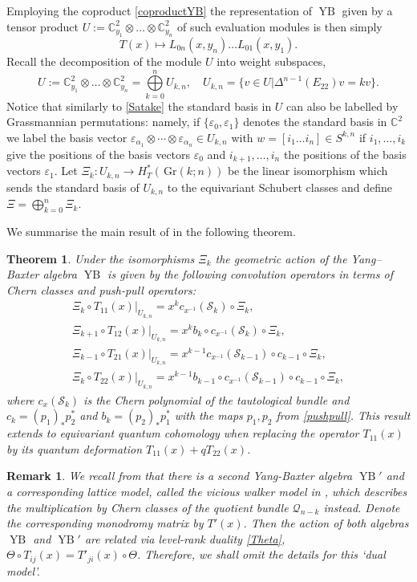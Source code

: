 \documentclass[12pt]{amsart}
\newcommand{\C}{\mathbb{C}}
\newcommand{\cS}{\mathcal{S}}
\newcommand{\cQ}{\mathcal{Q}}
\newcommand{\Gr}{\,\mathrm{Gr}}
\newcommand{\veps}{\varepsilon}
\newtheorem{remark}{Remark}[section]
\newtheorem{thm}{Theorem}[section]
\numberwithin{equation}{section}
\numberwithin{figure}{section}
\newcommand{\YB}{\operatorname{YB}}
\begin{document}
Employing the coproduct \eqref{coproductYB} the representation of $\YB$ given by a tensor product $U := \C^2_{y_1} \otimes \ldots \otimes \C^2_{y_n}$ of such evaluation modules is then simply
\[
T(x) \mapsto L_{0n}(x , y_n) \ldots L_{01}(x , y_1).
\]
Recall the decomposition of the module $U$ into weight subspaces,
\[
U := \C^2_{y_1} \otimes \ldots \otimes \C^2_{y_n} = \bigoplus\limits_{k = 0}^n U_{k , n}, \quad U_{k,n} = \{v \in U | \Delta^{n - 1}(E_{22}) v = k v\}.
\]
Notice that similarly to \eqref{Satake} the standard basis in $U$ can also be labelled by Grassmannian permutations: namely, if $\{\veps_0,\veps_1\}$ denotes the standard basis in $\C^2$ we label the basis vector $\veps_{\alpha_1}\otimes\cdots\otimes\veps_{\alpha_n}\in U_{k,n}$ with $w=[i_1\ldots i_n]\in S^{k,n}$ if $i_1,\ldots,i_k$ give the positions of the basis vectors $\veps_0$ and $i_{k+1},\ldots,i_n$ the positions of the basis vectors $\veps_1$. Let $\Xi_k : U_{k,n} \to H^*_{T}(\Gr(k;n))$ be the linear isomorphism which sends the standard basis of $U_{k,n}$ to the equivariant Schubert classes and define $\Xi = \bigoplus\limits_{k = 0}^n \Xi_k$.

We summarise the main result of \cite{GKS20} in the following theorem.
\begin{thm}\label{geom-lattice}
    Under the isomorphisms $\Xi_k$ the geometric action of the Yang--Baxter algebra $\YB$ is given by the following convolution operators in terms of Chern classes and push-pull operators:
    \begin{gather}
    \Xi_k \circ T_{11}(x)|_{U_{k,n}} = x^k c_{x^{-1}}(\cS_k) \circ \Xi_k, \\
    \Xi_{k + 1} \circ T_{12}(x)|_{U_{k,n}} = x^k b_k \circ c_{x^{-1}}(\cS_k) \circ \Xi_k, \\
    \Xi_{k - 1} \circ T_{21}(x)|_{U_{k,n}} = x^{k - 1}c_{x^{-1}}(\cS_{k - 1}) \circ c_{k-1} \circ \Xi_k, \\
    \Xi_{k} \circ T_{22}(x)|_{U_{k,n}} = x^{k - 1} b_{k - 1} \circ c_{x^{-1}}(\cS_{k - 1}) \circ c_{k-1} \circ \Xi_k,
    \end{gather}
    where $c_x(\cS_k)$ is the Chern polynomial of the tautological bundle and $c_k=(p_1)_* p_2^*$ and $b_k=(p_2)_* p_1^*$ with the maps $p_1,p_2$ from \eqref{pushpull}. This result extends to equivariant quantum cohomology when replacing the operator $T_{11}(x)$ by its quantum deformation $T_{11}(x) + q T_{22}(x)$.
\end{thm}

\begin{remark}\rm
    We recall from \cite{gorbounovkorff2014,GKS20} that there is a second Yang-Baxter algebra $\YB'$ and a corresponding lattice model, called the {\em vicious walker model} in \cite{korff2014quantum}, which describes the multiplication by Chern classes of the quotient bundle $\cQ_{n-k}$ instead. Denote the corresponding monodromy matrix by $T'(x)$. Then the action of both algebras $\YB$ and $\YB'$ are related via level-rank duality \eqref{Theta}, $\Theta\circ T_{ij}(x)=T'_{ji}(x)\circ\Theta$. Therefore, we shall omit the details for this `dual model'. 
\end{remark}
    
\end{document}
